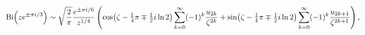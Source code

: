 \[\mathop{\mathrm{Bi}\/}\nolimits\!\left(ze^{\pm\pi i/3}\right)\mathrel{\sim}%
\sqrt{\frac{2}{\pi}}\frac{e^{\pm\pi i/6}}{z^{1/4}}\*\left(\mathop{\cos\/}%
\nolimits\!\left(\zeta-\tfrac{1}{4}\pi\mp\tfrac{1}{2}i\mathop{\ln\/}\nolimits 2%
\right)\sum_{k=0}^{\infty}(-1)^{k}\frac{u_{2k}}{\zeta^{2k}}+\mathop{\sin\/}%
\nolimits\!\left(\zeta-\tfrac{1}{4}\pi\mp\tfrac{1}{2}i\mathop{\ln\/}\nolimits 2%
\right)\sum_{k=0}^{\infty}(-1)^{k}\frac{u_{2k+1}}{\zeta^{2k+1}}\right),\]